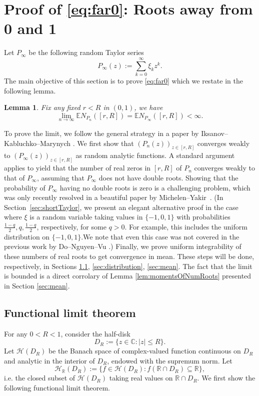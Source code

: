 \documentclass[12pt, reqno]{amsart}
\theoremstyle{plain}
\newtheorem{lemma}[theorem]{Lemma}
\theoremstyle{definition}
\newcommand\E{{\mathbb{E}}}
\begin{document}
\section{Proof of \eqref{eq:far0}: Roots away from 0 and 1}\label{sec:ConvFarFrom01}
Let $P_{\infty}$ be the following random Taylor series 
$$P_{\infty}(z) := \sum_{k = 0}^{\infty} \xi_k z^k.$$
The main objective of this section is to prove \eqref{eq:far0} which we restate in the following lemma. 
\begin{lemma}\label{lem:ConvFarFrom01}
    Fix any fixed $r<R$ in $ (0, 1)$, we have
    $$\lim_{n \rightarrow \infty} \E N_{P_n}([r, R]) = \E N_{P_{\infty}}([r, R]) < \infty.$$
\end{lemma}
To prove the limit, we follow the general strategy in a paper by Iksanov--Kabluchko--Marynych \cite{Iksanov2016}. We first show that  $(P_n(z))_{z \in [r, R]} $ converges weakly  to $(P_{\infty}(z))_{z \in [r, R]}$ as random analytic functions. A standard argument applies to yield that the number of real zeros in $[r, R]$ of $P_n$ converges weakly to that of $P_\infty$, assuming that $P_{\infty}$ does not have double roots. Showing that the probability of $P_{\infty}$ having no double roots is zero is a challenging problem, which was only recently resolved in a beautiful paper by Michelen--Yakir~\cite{MichelenYakir2025}. (In Section~\ref{sec:shortTaylor}, we present an elegant alternative proof in the case where $\xi$ is a random variable taking values in $\{-1,0,1\}$ with probabilities $\tfrac{1-q}{2}, q, \tfrac{1-q}{2}$, respectively, for some $q>0$. For example, this includes the uniform distribution on $\{-1,0,1\}$.We note that even this case was not covered in the previous work by Do--Nguyen--Vu \cite{DoHoiNguyenVu}.) Finally, we prove uniform integrability of these numbers of real roots to get convergence in mean. These steps will be done, respectively, in Sections \ref{sec:functional}, \ref{sec:distribution}, \ref{sec:mean}.
The fact that the limit is bounded is a direct corrolary of Lemma \ref{lem:momentsOfNumRoots} presented in Section \ref{sec:mean}.



\subsection{Functional limit theorem}\label{sec:functional} For any $0 < R < 1$, consider the half-disk
\begin{equation*}
    D_{R} := \{z \in \mathbb{C}: |z| \le R\}.
\end{equation*}
Let $\mathcal{H}(D_{R})$ be the Banach space of complex-valued function continuous on $D_{R}$ and analytic in the interior of $D_{R}$, endowed with the supremum norm. Let 
\begin{equation*}
    \mathcal{H}_{\mathbb{R}}(D_{R}) := \{f \in \mathcal{H}(D_R): f(\mathbb{R} \cap D_{R}) \subseteq \mathbb{R} \},
\end{equation*}
i.e. the closed subset of $\mathcal{H}(D_{R})$ taking real values on $\mathbb{R} \cap D_{R}$. We first show the following functional limit theorem.
\end{document}
